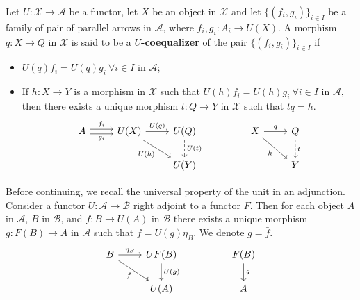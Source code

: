 \begin{mainbox}{}
    \begin{defi}
        Let $U:\mathcal{X} \to \mathcal{A}$ be a functor, let $X$ be an object in $\mathcal{X}$ and let $\{(f_i,g_i)\}_{i\in I}$ be a family of pair of parallel arrows in $\mathcal{A}$, where $f_i,g_i: A_i \to U(X)$. A morphism $q:X \to Q$ in $\mathcal{X}$ is said to be a $U$\textbf{-coequalizer} of the pair $\{(f_i,g_i)\}_{i\in I}$ if 
        \begin{itemize}
            \item $U(q) f_i = U(q) g_i \ \forall i \in I$ in $\mathcal{A}$;
            \item If $h:X \to Y$ is a morphism in $\mathcal{X}$ such that $U(h) f_i = U(h) g_i \ \forall i \in I$ in $\mathcal{A}$, then there exists a unique morphism $t:Q \to Y$ in $\mathcal{X}$ such that $t q = h$.
        \[
\begin{tikzcd}
A \arrow[r, "f_i", shift left] \arrow[r, "g_i"', shift right] & U(X) \arrow[r, "U(q)"] \arrow[rd, "U(h)"'] & U(Q) \arrow[d, "U(t)", dashed] &  & X \arrow[r, "q"] \arrow[rd, "h"'] & Q \arrow[d, "t", dashed] \\
                                                              &                                            & U(Y)                           &  &                                   & Y                       
\end{tikzcd}
        \]
        \end{itemize}
    \end{defi}
\end{mainbox}

Before continuing, we recall the universal property of the unit in an adjunction. Consider a functor $U: \mathcal{A} \to \mathcal{B}$ right adjoint to a functor $F$. Then for each object $A$ in $\mathcal{A}$, $B$ in $\mathcal{B}$, and $f:B \to U(A)$ in $\mathcal{B}$ there exists a unique morphism $g: F(B) \to A$ in $\mathcal{A}$ such that $f=U(g)\eta_B$. We denote $g = \bar{f}$. 
\[
\begin{tikzcd}
B \arrow[r, "\eta_B"] \arrow[rd, "f"'] & UF(B) \arrow[d, "U(g)"] &  & F(B) \arrow[d, "g"] \\
                                       & U(A)                    &  & A                  
\end{tikzcd}
\]

